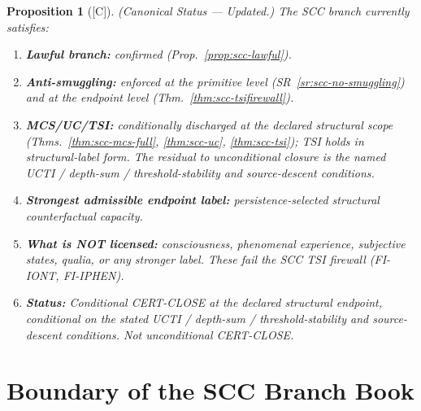 \documentclass[12pt,oneside]{amsbook}
\theoremstyle{plain}
\newtheorem{proposition}[theorem]{Proposition}
\theoremstyle{definition}
\theoremstyle{remark}
\newcommand{\status}[1]{\textup{[#1]}}
\begin{document}
\begin{proposition}[\status{C}]\label{prop:scc-status}
\textup{(Canonical Status --- Updated.)} The SCC branch currently satisfies:
\begin{enumerate}[label=\textup{(\arabic*)}]
 \item \textbf{Lawful branch:} confirmed (Prop.~\ref{prop:scc-lawful}).
 \item \textbf{Anti-smuggling:} enforced at the primitive level
 (SR~\ref{sr:scc-no-smuggling}) and at the endpoint level
 (Thm.~\ref{thm:scc-tsifirewall}).
 \item \textbf{MCS/UC/TSI:} conditionally discharged at the declared
 structural scope (Thms.~\ref{thm:scc-mcs-full}, \ref{thm:scc-uc},
 \ref{thm:scc-tsi}); TSI holds in structural-label form. The residual
 to \emph{unconditional} closure is the named UCTI / depth-sum /
 threshold-stability and source-descent conditions.
 \item \textbf{Strongest admissible endpoint label:}
 \emph{persistence-selected structural counterfactual
 capacity.}
 \item \textbf{What is NOT licensed:}
 consciousness, phenomenal experience, subjective states,
 qualia, or any stronger label. These fail the SCC TSI
 firewall (FI-IONT, FI-IPHEN).
 \item \textbf{Status:} \emph{Conditional CERT-CLOSE at the declared
 structural endpoint}, conditional on the stated UCTI / depth-sum /
 threshold-stability and source-descent conditions. Not unconditional
 CERT-CLOSE.
\end{enumerate}
\end{proposition}

\section{Boundary of the SCC Branch Book}
\end{document}
